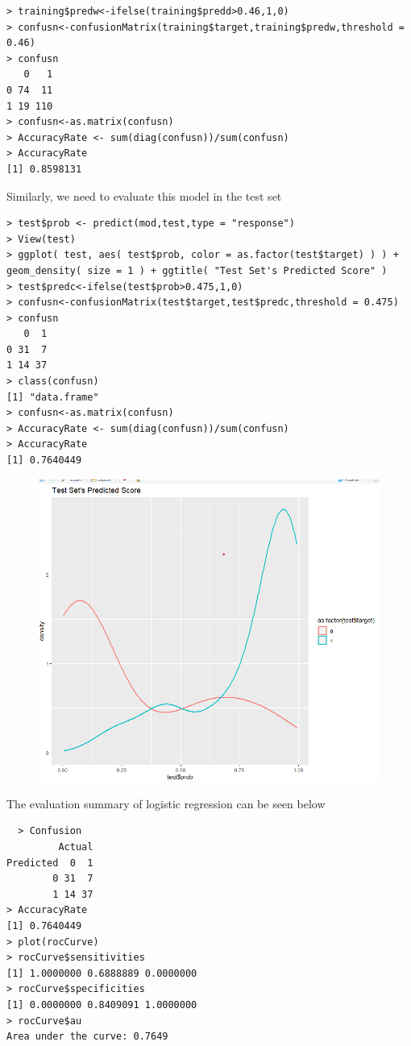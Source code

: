 \documentclass{article}
\begin{document}
\begin{lstlisting}
> training$predw<-ifelse(training$predd>0.46,1,0)
> confusn<-confusionMatrix(training$target,training$predw,threshold = 0.46)
> confusn
   0   1
0 74  11
1 19 110
> confusn<-as.matrix(confusn)
> AccuracyRate <- sum(diag(confusn))/sum(confusn)
> AccuracyRate
[1] 0.8598131
\end{lstlisting}
Similarly, we need to evaluate this model in the test set
\begin{lstlisting}
> test$prob <- predict(mod,test,type = "response")
> View(test)
> ggplot( test, aes( test$prob, color = as.factor(test$target) ) ) + geom_density( size = 1 ) + ggtitle( "Test Set's Predicted Score" )
> test$predc<-ifelse(test$prob>0.475,1,0)
> confusn<-confusionMatrix(test$target,test$predc,threshold = 0.475)
> confusn
   0  1
0 31  7
1 14 37
> class(confusn)
[1] "data.frame"
> confusn<-as.matrix(confusn)
> AccuracyRate <- sum(diag(confusn))/sum(confusn)
> AccuracyRate
[1] 0.7640449
\end{lstlisting}
\begin{figure}[H]
  \centering
  \includegraphics[width=1\textwidth]{task1_1_testScore.png}
\end{figure}
The evaluation summary of logistic regression can be seen below
\begin{lstlisting}
  > Confusion
         Actual
Predicted  0  1
        0 31  7
        1 14 37
> AccuracyRate
[1] 0.7640449
> plot(rocCurve)
> rocCurve$sensitivities
[1] 1.0000000 0.6888889 0.0000000
> rocCurve$specificities
[1] 0.0000000 0.8409091 1.0000000
> rocCurve$au
Area under the curve: 0.7649
\end{lstlisting}
\end{document}
